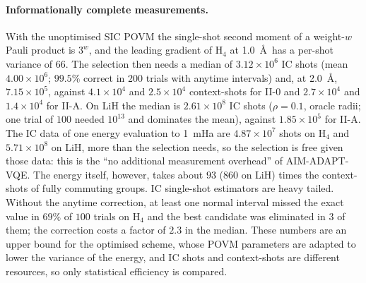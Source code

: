 \documentclass[aps,pra,reprint,superscriptaddress,nofootinbib]{revtex4-2}
\begin{document}
\paragraph{Informationally complete measurements.} With the unoptimised SIC POVM the single-shot second moment of a weight-$w$ Pauli product is $3^w$, and the leading gradient of H$_4$ at 1.0~\AA\ has a per-shot variance of $66$. The selection then needs a median of $3.12\times10^{6}$ IC shots (mean $4.00\times10^{6}$; $99.5\%$ correct in 200 trials with anytime intervals) and, at 2.0~\AA, $7.15\times10^{5}$, against $4.1\times10^{4}$ and $2.5\times10^{4}$ context-shots for II-0 and $2.7\times10^{4}$ and $1.4\times10^{4}$ for II-A. On LiH the median is $2.61\times10^{8}$ IC shots ($\rho=0.1$, oracle radii; one trial of $100$ needed $10^{13}$ and dominates the mean), against $1.85\times10^{5}$ for II-A. The IC data of one energy evaluation to 1~mHa are $4.87\times10^{7}$ shots on H$_4$ and $5.71\times10^{8}$ on LiH, more than the selection needs, so the selection is free given those data: this is the ``no additional measurement overhead'' of AIM-ADAPT-VQE. The energy itself, however, takes about $93$ ($860$ on LiH) times the context-shots of fully commuting groups. IC single-shot estimators are heavy tailed. Without the anytime correction, at least one normal interval missed the exact value in $69\%$ of $100$ trials on H$_4$ and the best candidate was eliminated in $3$ of them; the correction costs a factor of $2.3$ in the median. These numbers are an upper bound for the optimised scheme, whose POVM parameters are adapted to lower the variance of the energy, and IC shots and context-shots are different resources, so only statistical efficiency is compared.


\end{document}
